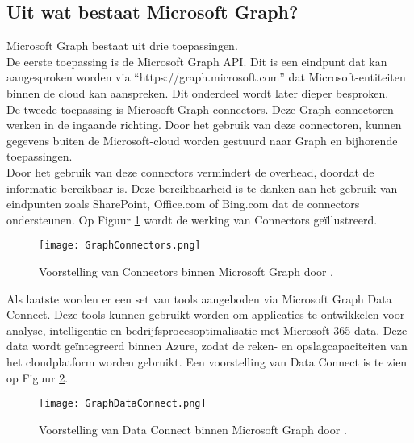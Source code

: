 
\subsection{Uit wat bestaat Microsoft Graph?}


Microsoft Graph bestaat uit drie toepassingen. \\

De eerste toepassing is de Microsoft Graph \Ac{API}. Dit is een eindpunt dat kan aangesproken worden via “https://graph.microsoft.com” dat Microsoft-entiteiten binnen de cloud kan aanspreken. Dit onderdeel wordt later dieper besproken. \\

De tweede toepassing is Microsoft Graph connectors. Deze Graph-connectoren werken in de ingaande richting. Door het gebruik van deze connectoren, kunnen gegevens buiten de Microsoft-cloud worden gestuurd naar Graph en bijhorende toepassingen. \\

Door het gebruik van deze connectors vermindert de overhead, doordat de informatie bereikbaar is. Deze bereikbaarheid is te danken aan het gebruik van eindpunten zoals SharePoint, Office.com of Bing.com dat de connectors ondersteunen. Op Figuur \ref{MSGC} wordt de werking van Connectors geïllustreerd. \\

\begin{figure}[!h]
    \texttt{[image: GraphConnectors.png]}
    \caption[Voorbeeld Microsoft Graph Connectors]{Voorstelling van Connectors binnen Microsoft Graph door \textcite{Hay2021}.}
    \label{MSGC}
\end{figure}

Als laatste worden er een set van tools aangeboden via Microsoft Graph Data Connect. Deze tools kunnen gebruikt worden om applicaties te ontwikkelen voor analyse, intelligentie en bedrijfsprocesoptimalisatie met Microsoft 365-data. Deze data wordt geïntegreerd binnen Azure, zodat de reken- en opslagcapaciteiten van het cloudplatform worden gebruikt. Een voorstelling van Data Connect is te zien op Figuur \ref{MSGDC}. \\

\begin{figure}[!h]
    \texttt{[image: GraphDataConnect.png]}
    \caption[Voorbeeld Microsoft Graph Data Connect]{Voorstelling van Data Connect binnen Microsoft Graph door \textcite{Microsoft2022c}.}
    \label{MSGDC}
\end{figure}

